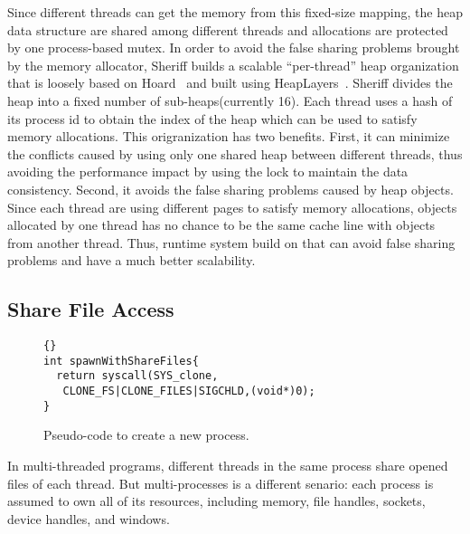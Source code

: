 Since different threads can get the memory from this fixed-size mapping, the heap data structure are shared among different
threads and allocations are protected by one process-based mutex.
In order to avoid the false sharing problems brought by the memory allocator, 
Sheriff builds a scalable ``per-thread'' heap organization that is loosely based on Hoard~\cite{BergerMcKinleyBlumofeWilson:ASPLOS2000} and built using HeapLayers~\cite{BergerZornMcKinley:2001}. 
Sheriff divides the heap into a fixed number of sub-heaps(currently 16). Each thread uses a hash of its process id to obtain
the index of the heap which can be used to satisfy memory allocations. 
This origranization has two benefits. First, it can minimize the conflicts caused by using only 
one shared heap between different threads, thus avoiding the performance impact by using the lock to 
maintain the data consistency.
Second, it avoids the false sharing problems caused by heap objects. Since each thread are using different pages 
to satisfy memory allocations, objects allocated by one thread has no chance to be the same 
cache line with objects from another thread. Thus, runtime system build on that can avoid false sharing problems 
and have a much better scalability. 

\begin{comment}
Not all memory allocations are meet from the protected heap to avoid the performance problem. 
Since those accesses on protected heap, the first write on each transaction should pay the overhead to 
create the copies and later should do the comparison and commit in the end of transaction.
Those overhead is additional comparing to normal running of multi-threaded program. 
We believe that false sharing problem has a greater chance to happen in those small allocations (smaller than cores number 
times of cache line size). Huge block of memory normally is not a source of false sharing problem. 
Besides those mapping to work as a shared backstore and a working copy, Sheriff provides an additional MAP\_SHARED mapping 
which is used to meet the allocation requirements of larger objects.
\end{comment}

\subsection{Share File Access}
\label{sec:fileshare}
\begin{figure}[!t]
\small
\begin{lstlisting}[frame=trbl]{}
int spawnWithShareFiles{
  return syscall(SYS_clone, 
   CLONE_FS|CLONE_FILES|SIGCHLD,(void*)0);
}
\end{lstlisting}
\caption{Pseudo-code to create a new process.
\label{fig:newfork}}
\end{figure}
In multi-threaded programs, different threads in the same process share opened files of each thread. 
But multi-processes is a different senario: 
each process is assumed to own all of its resources, including memory, file handles, sockets, device handles, and windows. 

